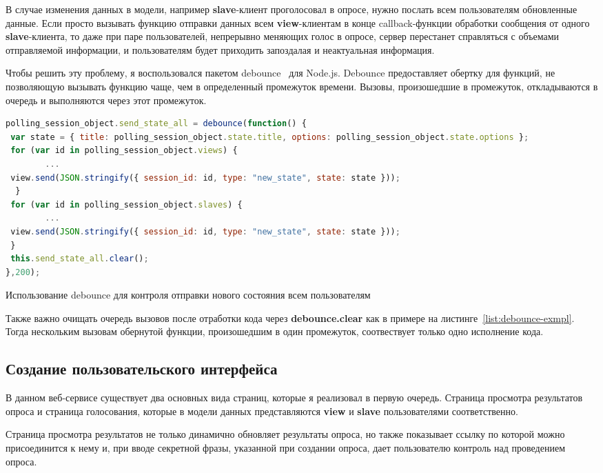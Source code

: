 В случае изменения данных в модели, например \textbf{slave}-клиент проголосовал в опросе, нужно послать всем пользователям обновленные данные. Если просто вызывать функцию отправки данных всем \textbf{view}-клиентам в конце callback-функции обработки сообщения от одного \textbf{slave}-клиента, то даже при паре пользователей, непрерывно меняющих голос в опросе, сервер перестанет справляться с объемами отправляемой информации, и пользователям будет приходить запоздалая и неактуальная информация.

Чтобы решить эту проблему, я воспользовался пакетом debounce~\autocite{debounce} для Node.js. Debounce предоставляет обертку для функций, не позволяющую вызывать функцию чаще, чем в определенный промежуток времени. Вызовы, произошедшие в промежуток, откладываются в очередь и выполняются через этот промежуток.
 \begin{ListingEnv}[H]
	\begin{lstlisting}[language=JavaScript]
polling_session_object.send_state_all = debounce(function() {
 var state = { title: polling_session_object.state.title, options: polling_session_object.state.options };
 for (var id in polling_session_object.views) {
		...
 view.send(JSON.stringify({ session_id: id, type: "new_state", state: state }));
  }
 for (var id in polling_session_object.slaves) {
		...
 view.send(JSON.stringify({ session_id: id, type: "new_state", state: state }));
 }
 this.send_state_all.clear();
},200);
\end{lstlisting}
\caption{Использование debounce для контроля отправки нового состояния всем пользователям}
\label{list:debounce-exmpl}
\end{ListingEnv}      

Также важно очищать очередь вызовов после отработки кода через \textbf{debounce.clear} как в примере на листинге~\ref{list:debounce-exmpl}. Тогда нескольким вызовам обернутой функции, произошедшим в один промежуток, соотвествует только одно исполнение кода.

\subsection{Создание пользовательского интерфейса}
В данном веб-сервисе существует два основных вида страниц, которые я реализовал в первую очередь. Страница просмотра результатов опроса и страница голосования, которые в модели данных представляются \textbf{view} и \textbf{slave} пользователями соответственно.

Страница просмотра результатов не только динамично обновляет результаты опроса, но также показывает ссылку по которой можно присоединится к нему и, при вводе секретной фразы, указанной при создании опроса, дает пользователю контроль над проведением опроса.

